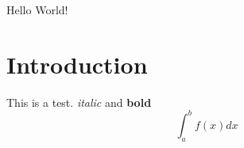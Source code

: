 \documentclass{article}
\begin{document}
Hello World!
\section{Introduction}
This is a test.
\emph{italic} and \textbf{bold}
\[\int_a^b f(x)dx\]
\end{document}
